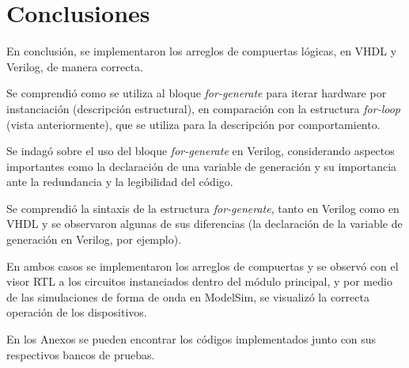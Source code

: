 \section{Conclusiones}
En conclusión, se implementaron los arreglos de compuertas lógicas, en VHDL y Verilog, de manera correcta.

Se comprendió como se utiliza al bloque \textit{for-generate} para iterar hardware por instanciación (descripción estructural), en comparación con la estructura \textit{for-loop} (vista anteriormente), que se utiliza para la descripción por comportamiento.

Se indagó sobre el uso del bloque \textit{for-generate} en Verilog, considerando aspectos importantes como la declaración de una variable de generación y su importancia ante la redundancia y la legibilidad del código.

Se comprendió la sintaxis de la estructura \textit{for-generate}, tanto en Verilog como en VHDL y se observaron algunas de sus diferencias (la declaración de la variable de generación en Verilog, por ejemplo).

En ambos casos se implementaron los arreglos de compuertas y se observó con el visor RTL a los circuitos instanciados dentro del módulo principal, y por medio de las simulaciones de forma de onda en ModelSim, se visualizó la correcta operación de los dispositivos.

En los Anexos se pueden encontrar los códigos implementados junto con sus respectivos bancos de pruebas. 